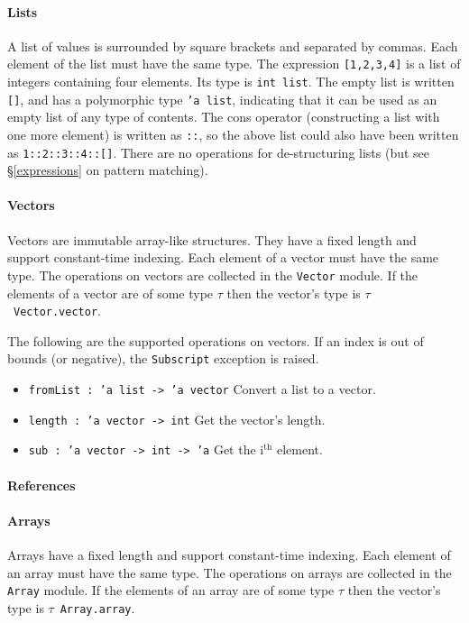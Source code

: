 \documentclass[12pt,a4paper]{book}
\begin{document}
\paragraph{Lists} A list of values is surrounded by square brackets and separated by commas. Each element of the list must have the same type. The expression \texttt{[1,2,3,4]} is a list of integers containing four elements. Its type is \texttt{int list}. The empty list is written \texttt{[]}, and has a polymorphic type \texttt{'a list}, indicating that it can be used as an empty list of any type of contents. The cons operator (constructing a list with one more element) is written as \texttt{::}, so the above list could also have been written as \texttt{1::2::3::4::[]}. There are no operations for de-structuring lists (but see \S\ref{expressions} on pattern matching).

\paragraph{Vectors}

Vectors are immutable array-like structures. They have a fixed length and support constant-time indexing. Each element of a vector must have the same type. The operations on vectors are collected in the \texttt{Vector} module. If the elements of a vector are of some type $\tau$ then the vector's type is $\tau$\ \texttt{Vector.vector}.

The following are the supported operations on vectors. If an index is out of bounds (or negative), the \texttt{Subscript} exception is raised.
\begin{itemize}
\item \texttt{fromList : 'a list -> 'a vector} Convert a list to a vector.
\item \texttt{length : 'a vector -> int} Get the vector's length.
\item \texttt{sub : 'a vector -> int -> 'a} Get the i$^\textrm{th}$ element.
\end{itemize}

\paragraph{References}

\paragraph{Arrays}

Arrays have a fixed length and support constant-time indexing. Each element of an array must have the same type. The operations on arrays are collected in the \texttt{Array} module. If the elements of an array are of some type $\tau$ then the vector's type is $\tau$\ \texttt{Array.array}.
\end{document}
